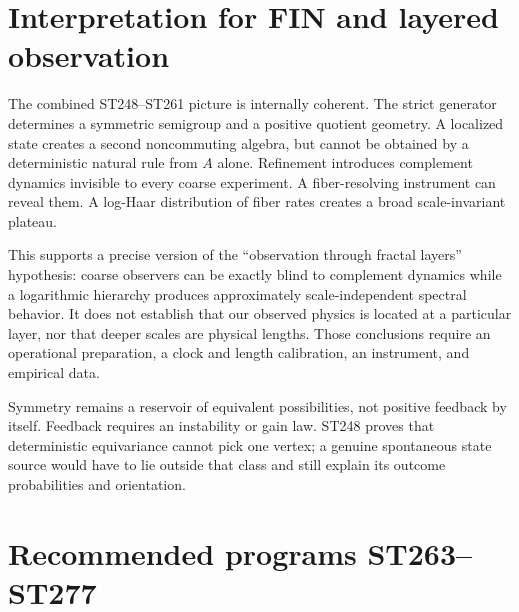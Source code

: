\documentclass[11pt,a4paper]{article}
\begin{document}
\section{Interpretation for FIN and layered observation}

The combined ST248--ST261 picture is internally coherent. The strict generator determines a
symmetric semigroup and a positive quotient geometry. A localized state creates a second
noncommuting algebra, but cannot be obtained by a deterministic natural rule from $A$
alone. Refinement introduces complement dynamics invisible to every coarse experiment. A
fiber-resolving instrument can reveal them. A log-Haar distribution of fiber rates creates
a broad scale-invariant plateau.

This supports a precise version of the ``observation through fractal layers'' hypothesis:
coarse observers can be exactly blind to complement dynamics while a logarithmic hierarchy
produces approximately scale-independent spectral behavior. It does not establish that
our observed physics is located at a particular layer, nor that deeper scales are physical
lengths. Those conclusions require an operational preparation, a clock and length
calibration, an instrument, and empirical data.

Symmetry remains a reservoir of equivalent possibilities, not positive feedback by itself.
Feedback requires an instability or gain law. ST248 proves that deterministic equivariance
cannot pick one vertex; a genuine spontaneous state source would have to lie outside that
class and still explain its outcome probabilities and orientation.

\section{Recommended programs ST263--ST277}
\end{document}
